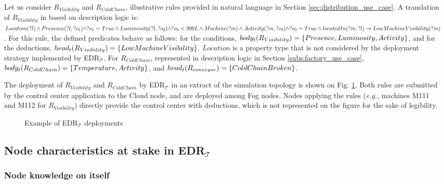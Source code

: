 \documentclass{iosart2c}
\newcommand{\edrt}{EDR$_{\mathcal{T}}$\xspace}
\begin{document}
Let us consider $R_{Visibility}$ and $R_{ColdChain}$, illustrative rules provided in natural language in Section \textsection \ref{sec:distribution_use_case}. 
A translation of $R_{Visibility}$ in based on description logic is: $Lo\-ca\-tion(?l) \land Pre\-sence(?l, ?o_1) \land ?o_1 = True \land Lu\-mi\-no\-si\-ty(?l, ?o_2) \land ?o_2 < 300L \land Ma\-chine(?m) \land Ac\-ti\-vi\-ty(?m, ?o_3) \land ?o_3 = True \land located\-In(?m, ?l) \rightarrow Low\-Machine\-Vi\-si\-bi\-li\-ty(?m)$.
For this rule, the defined predicates behave as follows: for the conditions, $body_t(R_{Visibility})=\{Pre\-sence, Lu\-mi\-no\-si\-ty, Ac\-ti\-vi\-ty\}$, and for the deductions,  $head_t(R_{Visibility})= \{Low\-Ma\-chine\-Vi\-si\-bi\-li\-ty\}$. 
$Location$ is a property type that is not considered by the deployment strategy implemented by \edrt.
For $R_{ColdChain}$, represented in description logic in Section \textsection \ref{subs:factory_use_case}, $body_t(R_{ColdChain})=\{Tem\-pe\-ra\-ture, Ac\-ti\-vi\-ty\}$, and $head_t(R_{conveyor})= \{Cold\-Chain\-Bro\-ken\}$.

The deployment of $R_{Visibility}$ and $R_{ColdChain}$ by \edrt in an extract of the simulation topology is shown on Fig. \ref{fig:edrpt_deployment}.
Both rules are submitted by the control center application to the Cloud node, and are deployed among Fog nodes.
Nodes applying the rules (\textit{e.g.,} machines M111 and M112 for $R_{Visibility}$) directly provide the control center with deductions, which is not represented on the figure for the sake of legibility.

\begin{figure}
	\centering
	\caption{Example of \edrt deployments}
	\label{fig:edrpt_deployment}
	\scalebox{0.8}{
		
	}
\end{figure}

\subsection{Node characteristics at stake in \edrt}
\label{subs:edrt_knowledge}

\subsubsection{Node knowledge on itself}
\label{subsub:self-knowledge}
\end{document}
